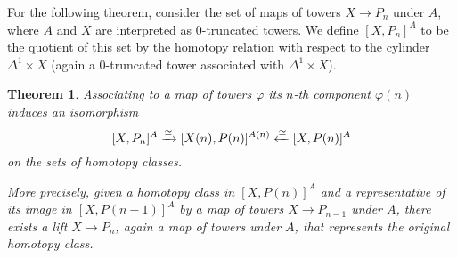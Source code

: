 \documentclass[12pt,a4wide]{article}
\theoremstyle{plain}
\newtheorem{theorem}{Theorem}[section]
\theoremstyle{definition}
\newcommand{\Pst}[1]{P(#1)}
\newcommand{\Pnewst}{\Pst{\then}}
\newcommand{\Poldst}{\Pst{\then-1}}
\newcommand{\towercompmap}[2]{#1(#2)}
\newcommand{\then}{n}
\newcommand{\thedim}{{n}}
\newcommand{\Pnew}{{P_\thedim}}
\newcommand{\Pold}{{P_{\thedim-1}}}
\renewcommand\:{\colon}
\begin{document}

For the following theorem, consider the set of maps of towers $X \to \Pnew$ under $A$, where $A$ and $X$ are interpreted as 0-truncated towers. We define $[X, \Pnew]^A$ to be the quotient of this set by the homotopy relation with respect to the cylinder $\Delta^1 \times X$ (again a 0-truncated tower associated with $\Delta^1 \times X$).

\begin{theorem}\label{t:representing_homotopy_classes}
Associating to a map of towers $\varphi$ its $\then$-th component $\towercompmap{\varphi}{\then}$ induces an isomorphism
\[[X, \Pnew]^{A} \xra\cong [\towercomp{X}{n}, \Pnewst]^{\towercomp{A}{n}} \xla\cong [X, \Pnewst]^A\]
on the sets of homotopy classes.

More precisely, given a homotopy class in $[X, \Pnewst]^A$ and a representative of its image in $[X, \Poldst]^A$ by a map of towers $X \to \Pold$ under $A$, there exists a lift $X \to \Pnew$, again a map of towers under $A$, that represents the original homotopy class.
\end{theorem}
\end{document}
